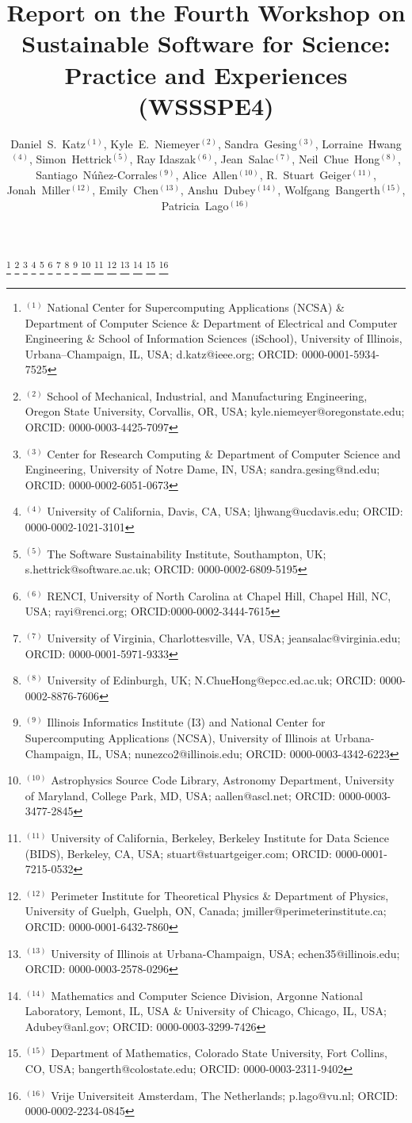 \documentclass[11pt, oneside]{amsart}
\begin{document}
\title[]{Report on the Fourth Workshop on Sustainable Software for Science: Practice and Experiences (WSSSPE4)}

\author{Daniel~S.~Katz$^{(1)}$,
Kyle~E.~Niemeyer$^{(2)}$,
Sandra~Gesing$^{(3)}$,
Lorraine~Hwang$^{(4)}$,
Simon~Hettrick$^{(5)}$,
Ray Idaszak$^{(6)}$,
Jean~Salac$^{(7)}$,
Neil~Chue~Hong$^{(8)}$,
Santiago~N\'u\~nez-Corrales$^{(9)}$,
Alice~Allen$^{(10)}$,
R.~Stuart~Geiger$^{(11)}$,
Jonah~Miller$^{(12)}$,
Emily~Chen$^{(13)}$,
Anshu~Dubey$^{(14)}$,
Wolfgang~Bangerth$^{(15)}$,
Patricia~Lago$^{(16)}$
}

%
\thanks{{}$^{(1)}$ National Center for Supercomputing Applications (NCSA) \&
Department of Computer Science  \&
Department of Electrical and Computer Engineering  \&
School of Information Sciences (iSchool),
University of Illinois, Urbana--Champaign, IL, USA; d.katz@ieee.org; ORCID: 0000-0001-5934-7525}
%
\thanks{{}$^{(2)}$ School of Mechanical, Industrial, and Manufacturing Engineering,
Oregon State University, Corvallis, OR, USA; kyle.niemeyer@oregonstate.edu; ORCID: 0000-0003-4425-7097}
%
\thanks{{}$^{(3)}$ Center for Research Computing \& Department of Computer Science and Engineering,
University of Notre Dame, IN, USA; sandra.gesing@nd.edu; ORCID: 0000-0002-6051-0673}
%
\thanks{{}$^{(4)}$ University of California, Davis, CA, USA; ljhwang@ucdavis.edu; ORCID: 0000-0002-1021-3101}
%
\thanks{{}$^{(5)}$ The Software Sustainability Institute, Southampton, UK; s.hettrick@software.ac.uk; ORCID: 0000-0002-6809-5195}
%
\thanks{{}$^{(6)}$ RENCI, University of North Carolina at Chapel Hill, Chapel Hill, NC, USA; rayi@renci.org; ORCID:0000-0002-3444-7615}
%
\thanks{{}$^{(7)}$ University of Virginia, Charlottesville, VA, USA; jeansalac@virginia.edu; ORCID: 0000-0001-5971-9333}
%
\thanks{{}$^{(8)}$ University of Edinburgh, UK; N.ChueHong@epcc.ed.ac.uk;
ORCID: 0000-0002-8876-7606}
%
\thanks{{}$^{(9)}$ Illinois Informatics Institute (I3) and National Center for Supercomputing Applications (NCSA), University of Illinois at Urbana-Champaign, IL, USA;
nunezco2@illinois.edu;
ORCID: 0000-0003-4342-6223}
%
\thanks{{}$^{(10)}$ Astrophysics Source Code Library, Astronomy Department, University of Maryland, College Park, MD, USA; aallen@ascl.net; ORCID: 0000-0003-3477-2845}
%
\thanks{{}$^{(11)}$ University of California, Berkeley, Berkeley Institute for Data Science (BIDS), Berkeley, CA, USA; stuart@stuartgeiger.com; ORCID: 0000-0001-7215-0532}
%
\thanks{{}$^{(12)}$ Perimeter Institute for Theoretical Physics \&
Department of Physics, University of Guelph,
Guelph, ON, Canada;
jmiller@perimeterinstitute.ca; ORCID: 0000-0001-6432-7860}
%
\thanks{{}$^{(13)}$ University of Illinois at Urbana-Champaign, USA; echen35@illinois.edu; ORCID: 0000-0003-2578-0296}
%
\thanks{{}$^{(14)}$ Mathematics and Computer Science Division,
Argonne National Laboratory,
Lemont, IL, USA \&
University of Chicago,
Chicago, IL, USA;
Adubey@anl.gov;
ORCID: 0000-0003-3299-7426}
%
\thanks{{}$^{(15)}$ Department of Mathematics, Colorado State
  University, Fort Collins, CO, USA; bangerth@colostate.edu; ORCID: 0000-0003-2311-9402}
%
\thanks{{}$^{(16)}$ Vrije Universiteit Amsterdam, The Netherlands; p.lago@vu.nl; ORCID: 0000-0002-2234-0845}
\end{document}
